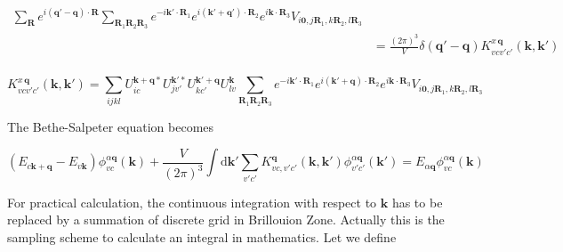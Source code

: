 \begin{equation*}
\begin{aligned}
        \sum_{\boldsymbol{R}} e^{i(\boldsymbol{q}'-\boldsymbol{q}) \cdot \boldsymbol{R}} 
        \sum_{\boldsymbol{R}_1\boldsymbol{R}_2\boldsymbol{R}_3} 
        e^{-i\boldsymbol{k}' \cdot \boldsymbol{R}_1} 
        e^{i(\boldsymbol{k}'+\boldsymbol{q}') \cdot \boldsymbol{R}_2}
        e^{i\boldsymbol{k} \cdot \boldsymbol{R}_3} 
        V_{i\boldsymbol{0},j\boldsymbol{R}_1,k\boldsymbol{R}_2,l\boldsymbol{R}_3} \\
      &= \frac{(2\pi)^3}{V} \delta(\boldsymbol{q}'-\boldsymbol{q}) 
        K_{vcv'c'}^{x \, \boldsymbol{q}}(\boldsymbol{k}, \boldsymbol{k}') \\
  \end{aligned}
\end{equation*}

\begin{equation}\label{Kx-wannier}
  K_{vcv'c'}^{x \, \boldsymbol{q}}(\boldsymbol{k}, \boldsymbol{k}') 
  = \sum_{ijkl} U_{ic}^{\boldsymbol{k}+\boldsymbol{q}*} U_{jv'}^{\boldsymbol{k}'*} 
      U_{kc'}^{\boldsymbol{k}'+\boldsymbol{q}} U_{lv}^{\boldsymbol{k}} 
    \sum_{\boldsymbol{R}_1\boldsymbol{R}_2\boldsymbol{R}_3} 
      e^{-i\boldsymbol{k}' \cdot \boldsymbol{R}_1} 
      e^{i(\boldsymbol{k}'+\boldsymbol{q}) \cdot \boldsymbol{R}_2}
      e^{i\boldsymbol{k} \cdot \boldsymbol{R}_3} 
      V_{i\boldsymbol{0},j\boldsymbol{R}_1,k\boldsymbol{R}_2,l\boldsymbol{R}_3}
\end{equation}

\noindent
The Bethe-Salpeter equation becomes

\begin{equation}
  (E_{c\boldsymbol{k} + \boldsymbol{q}} - E_{v\boldsymbol{k}}) \phi_{vc}^{\alpha\boldsymbol{q}}(\boldsymbol{k}) 
  + \frac{V}{(2\pi)^3} \int \mathrm{d}\boldsymbol{k}' \sum_{v'c'} 
    K_{vc,v'c'}^{\boldsymbol{q}}(\boldsymbol{k},\boldsymbol{k}') 
    \phi_{v'c'}^{\alpha\boldsymbol{q}} (\boldsymbol{k}') 
  = E_{\alpha \boldsymbol{q}} \phi_{vc}^{\alpha\boldsymbol{q}}(\boldsymbol{k}) 
\end{equation}

For practical calculation, 
the continuous integration with respect to $\boldsymbol{k}$ has to be replaced by a summation of discrete grid in Brillouion Zone.
Actually this is the sampling scheme to calculate an integral in mathematics.
Let we define

